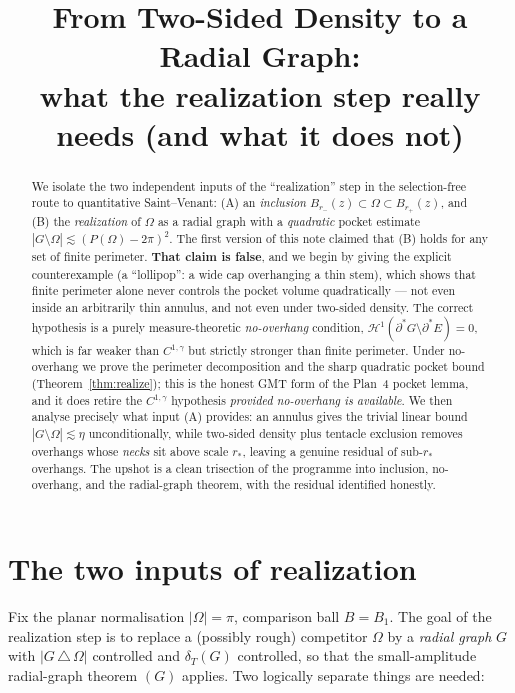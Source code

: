 \documentclass[11pt]{article}
\title{From Two-Sided Density to a Radial Graph:\\
       what the realization step really needs (and what it does not)}
\author{}
\date{}
\theoremstyle{definition}
\newcommand{\Om}{\Omega}
\newcommand{\HH}{\mathcal H}
\newcommand{\dT}{\delta_T}
\begin{document}
\maketitle

\begin{abstract}
We isolate the two independent inputs of the ``realization'' step in the
selection-free route to quantitative Saint--Venant: (A) an
\emph{inclusion} $B_{r_-}(z)\subset\Om\subset B_{r_+}(z)$, and (B) the
\emph{realization} of $\Om$ as a radial graph with a \emph{quadratic}
pocket estimate $|G\setminus\Om|\lesssim(P(\Om)-2\pi)^2$. The first
version of this note claimed that (B) holds for any set of finite
perimeter. \textbf{That claim is false}, and we begin by giving the
explicit counterexample (a ``lollipop'': a wide cap overhanging a thin
stem), which shows that finite perimeter alone never controls the pocket
volume quadratically --- not even inside an arbitrarily thin annulus, and
not even under two-sided density. The correct hypothesis is a purely
measure-theoretic \emph{no-overhang} condition,
$\HH^1(\partial^*G\setminus\partial^*E)=0$, which is far weaker than
$C^{1,\gamma}$ but strictly stronger than finite perimeter. Under
no-overhang we prove the perimeter decomposition and the sharp quadratic
pocket bound (Theorem~\ref{thm:realize}); this is the honest GMT form of
the Plan~4 pocket lemma, and it does retire the $C^{1,\gamma}$ hypothesis
\emph{provided no-overhang is available}. We then analyse precisely what
input (A) provides: an annulus gives the trivial linear bound
$|G\setminus\Om|\lesssim\eta$ unconditionally, while two-sided density
plus tentacle exclusion removes overhangs whose \emph{necks} sit above
scale $r_*$, leaving a genuine residual of sub-$r_*$ overhangs. The
upshot is a clean trisection of the programme into inclusion, no-overhang,
and the radial-graph theorem, with the residual identified honestly.
\end{abstract}

\section{The two inputs of realization}

Fix the planar normalisation $|\Om|=\pi$, comparison ball $B=B_1$. The
goal of the realization step is to replace a (possibly rough) competitor
$\Om$ by a \emph{radial graph} $G$ with $|G\,\triangle\,\Om|$ controlled
and $\dT(G)$ controlled, so that the small-amplitude radial-graph theorem
$(G)$ applies. Two logically separate things are needed:
\end{document}
